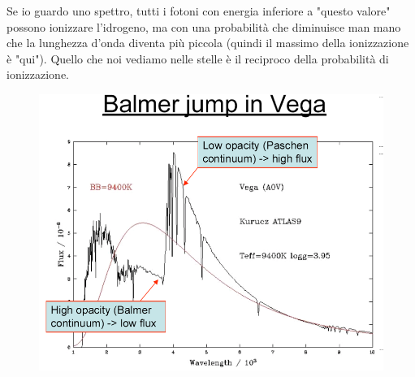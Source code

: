 \documentclass[a4paper,11pt]{article}
\begin{document}
Se io guardo uno spettro, tutti i fotoni con energia inferiore a "questo valore" possono ionizzare l'idrogeno, ma con una probabilità che diminuisce man mano che la lunghezza d'onda diventa più piccola (quindi il massimo della ionizzazione è "qui"). Quello che noi vediamo nelle stelle è il reciproco della probabilità di ionizzazione.

\begin{figure} [h]
    \centering
    \includegraphics[width=12cm]{28-10.35(Balmer-jump).png}
    \label{fig:balmer-jump}
\end{figure}
\end{document}
